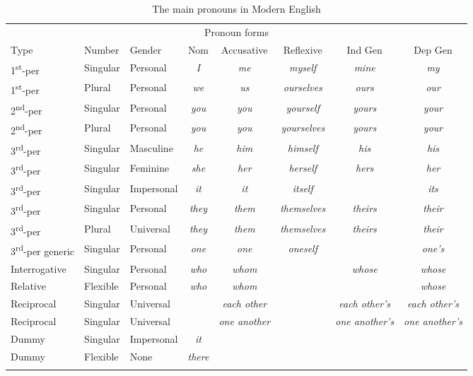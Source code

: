 \begin{table}
\caption{The main pronouns in Modern English}
\label{tab:pronouns}
\begin{tabular}{l l l c c c c c}
\multicolumn{8}{c}{Pronoun forms} \\
\lsptoprule
Type & Number & Gender & Nom & Accusative & Reflexive & Ind Gen & Dep Gen \\
\midrule
1\textsuperscript{st}-per & Singular & Personal & \textit{I} & \textit{me} & \textit{myself} & \textit{mine} & \textit{my} \\
1\textsuperscript{st}-per & Plural & Personal & \textit{we} & \textit{us} & \textit{ourselves} & \textit{ours} & \textit{our} \\
2\textsuperscript{nd}-per & Singular & Personal & \textit{you} & \textit{you} & \textit{yourself} & \textit{yours} & \textit{your} \\
2\textsuperscript{nd}-per & Plural & Personal & \textit{you} & \textit{you} & \textit{yourselves} & \textit{yours} & \textit{your} \\
3\textsuperscript{rd}-per & Singular & Masculine & \textit{he} & \textit{him} & \textit{himself} & \textit{his} & \textit{his} \\
3\textsuperscript{rd}-per & Singular & Feminine & \textit{she} & \textit{her} & \textit{herself} & \textit{hers} & \textit{her} \\
3\textsuperscript{rd}-per & Singular & Impersonal & \textit{it} & \textit{it} & \textit{itself} & & \textit{its} \\
3\textsuperscript{rd}-per & Singular & Personal & \textit{they} & \textit{them} & \textit{themselves} & \textit{theirs} & \textit{their} \\
3\textsuperscript{rd}-per & Plural & Universal & \textit{they} & \textit{them} & \textit{themselves} & \textit{theirs} & \textit{their} \\
3\textsuperscript{rd}-per generic & Singular & Personal & \textit{one} & \textit{one} & \textit{oneself} & & \textit{one's} \\
Interrogative & Singular & Personal & \textit{who} & \textit{whom} & & \textit{whose} & \textit{whose} \\
Relative & Flexible & Personal & \textit{who} & \textit{whom} & &  & \textit{whose} \\
Reciprocal & Singular & Universal &  & \textit{each other} & & \textit{each other's} & \textit{each other's} \\
Reciprocal & Singular & Universal &  & \textit{one another} & & \textit{one another's} & \textit{one another's} \\
Dummy & Singular & Impersonal & \textit{it} & & & & \\
Dummy & Flexible & None & \textit{there} & & & & \\
\lspbottomrule
\end{tabular}
\end{table}

